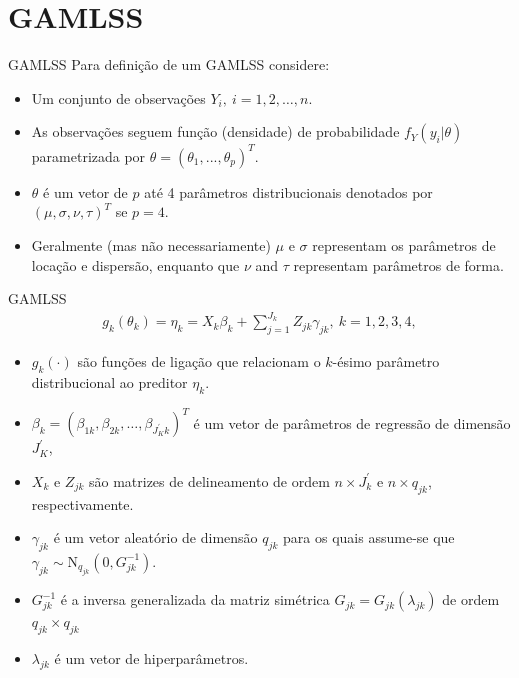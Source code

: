 \documentclass[
  ignorenonframetext,
  serif,
  professionalfont,
  usenames,
  dvipsnames,
  aspectratio = 169]{beamer}
\begin{document}
\hypertarget{gamlss-2}{%
\section{GAMLSS}\label{gamlss-2}}

\begin{frame}{GAMLSS}
\protect\hypertarget{gamlss-3}{}
Para definição de um GAMLSS considere:

\begin{itemize}
\item
  Um conjunto de observações \(Y_i, \ i=1,2,\ldots,n\).
\item
  As observações seguem função (densidade) de probabilidade
  \(f_Y(y_i|\theta)\) parametrizada por
  \(\theta = (\theta_{1}, ..., \theta_{p})^T\).
\item
  \(\theta\) é um vetor de \(p\) até 4 parâmetros distribucionais
  denotados por \((\mu, \sigma, \nu, \tau)^T\) se \(p=4\).
\item
  Geralmente (mas não necessariamente) \(\mu\) e \(\sigma\) representam
  os parâmetros de locação e dispersão, enquanto que \(\nu\) and
  \(\tau\) representam parâmetros de forma.
\end{itemize}
\end{frame}

\begin{frame}{GAMLSS}
\protect\hypertarget{gamlss-4}{}
\begin{equation}\label{eq.gamlss}
    \begin{aligned}
        g_{k}(\theta_{k}) = \eta_{k} = X_{k} \beta_{k} + \sum_{j=1}^{J_{k}} Z_{jk} \gamma_{jk},\ k=1,2,3,4,
    \end{aligned}
\end{equation}

\begin{itemize}
\item
  \(g_{k}(\cdot)\) são funções de ligação que relacionam o \(k\)-ésimo
  parâmetro distribucional ao preditor \(\eta_{k}\).
\item
  \(\beta_{k} = (\beta_{1k},\beta_{2k},\ldots,\beta_{J_{K}^{'}k})^T\) é
  um vetor de parâmetros de regressão de dimensão \(J_{K}^{'}\),
\item
  \(X_{k}\) e \(Z_{jk}\) são matrizes de delineamento de ordem
  \(n \times J_{k}^{'}\) e \(n \times q_{jk}\), respectivamente.
\item
  \(\gamma_{jk}\) é um vetor aleatório de dimensão \(q_{jk}\) para os
  quais assume-se que
  \(\gamma_{jk} \sim \text{N}_{q_{jk}}(0, G_{jk}^{-1})\).
\item
  \(G_{jk}^{-1}\) é a inversa generalizada da matriz simétrica
  \(G_{jk} = G_{jk}(\lambda_{jk})\) de ordem \(q_{jk} \times q_{jk}\)
\item
  \(\lambda_{jk}\) é um vetor de hiperparâmetros.
\end{itemize}
\end{frame}
\end{document}
